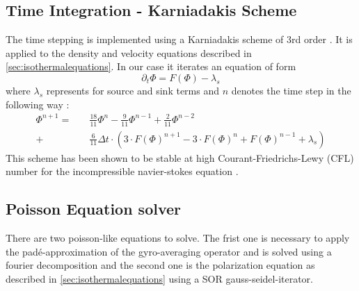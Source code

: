 \subsection{Time Integration - Karniadakis Scheme}
The time stepping is implemented using a Karniadakis scheme of 3rd order \cite{KARNIADAKIS1991414}.
It is applied to the density and velocity equations described in \autoref{sec:isothermalequations}.
In our case it iterates an equation of form
\begin{equation}
    \partial_t \Phi = F(\Phi) - \lambda_s
\end{equation}
where $\lambda_s$ represents for source and sink terms and $n$ denotes the time step in the following way :
\begin{equation}
\begin{split}
    \Phi^{n + 1} = \quad &\frac{18}{11} \Phi^{n} - \frac{9}{11} \Phi^{n-1} + \frac{2}{11}  \Phi^{n-2}\\
     + &\frac{6}{11}\Delta t \cdot (3 \cdot F(\Phi)^{n+1} - 3 \cdot F(\Phi)^{n} + F(\Phi)^{n-1} + \lambda_s)
\end{split}
\end{equation}
This scheme has been shown to be stable at high Courant-Friedrichs-Lewy (CFL) number for the incompressible navier-stokes equation \cite{KARNIADAKIS1991414}.

\subsection{Poisson Equation solver}
There are two poisson-like equations to solve. The frist one is necessary to apply the padé-approximation of the gyro-averaging operator and is solved using a fourier decomposition and the second one is the polarization equation as described in \autoref{sec:isothermalequations} using a \ac{SOR} gauss-seidel-iterator.

